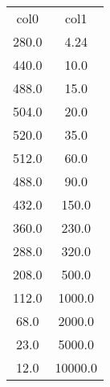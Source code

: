 \begin{table}
\begin{tabular}{cc}
col0 & col1 \\
280.0 & 4.24 \\
440.0 & 10.0 \\
488.0 & 15.0 \\
504.0 & 20.0 \\
520.0 & 35.0 \\
512.0 & 60.0 \\
488.0 & 90.0 \\
432.0 & 150.0 \\
360.0 & 230.0 \\
288.0 & 320.0 \\
208.0 & 500.0 \\
112.0 & 1000.0 \\
68.0 & 2000.0 \\
23.0 & 5000.0 \\
12.0 & 10000.0 \\
\end{tabular}
\end{table}

